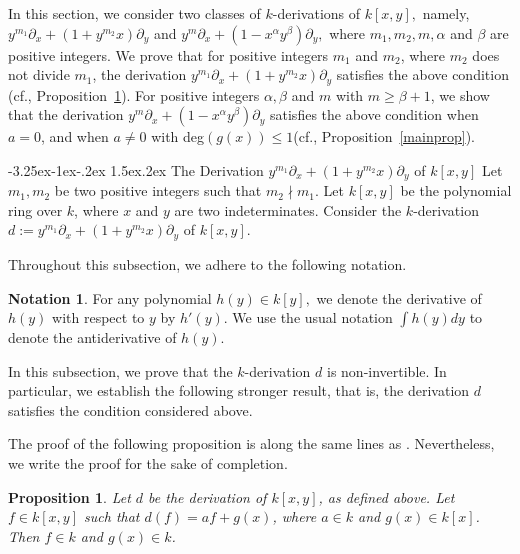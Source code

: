 \documentclass[12pt,reqno]{amsart}
\makeatletter
\renewcommand{\subsection}{%
  \@startsection{subsection}{2}{\z@}%
    {-3.25ex\@plus -1ex\@minus -.2ex}%
    {1.5ex\@plus .2ex}%
    {\normalfont\bfseries}}
\renewcommand{\leq}{\leqslant}
\renewcommand{\geq}{\geqslant}
\numberwithin{thm}{section}
\newtheorem{prop}[thm]{Proposition}
\theoremstyle{definition}
\newtheorem{nota}[thm]{Notation}
\numberwithin{equation}{thm}
\theoremstyle{plain}
\makeatother
\begin{document}
In this section, we consider two classes of $k$-derivations of $k[x,y],$ namely, $y^{m_1}\partial_{x}+(1+y^{m_2}x)\partial_{y}$ and $y^m\partial_x+(1-x^{\alpha} y^{\beta})\partial_y,$ where $m_1,m_2,m,\alpha$ and $\beta$ are positive integers. We prove that for positive integers $m_1$ and $m_2$, where $m_2$ does not divide $m_1$, the derivation $y^{m_1}\partial_{x}+(1+y^{m_2}x)\partial_{y}$ satisfies the above condition (cf., Proposition~\ref{prop:main}). For positive integers $\alpha,\beta$ and $m$ with $m\geq \beta+1$, we show that the derivation $y^m\partial_x+(1-x^{\alpha} y^{\beta})\partial_y$ satisfies the above condition when $a=0$, and when $a\neq 0$ with deg$(g(x))\leq 1$(cf., Proposition~\ref{mainprop}).   

\subsection{The Derivation $y^{m_1}\partial_{x}+(1+y^{m_2}x)\partial_{y}$ of $k[x,y]$} 
\vspace{0.5 cm}
Let $m_1,m_2$ be two positive integers such that $m_2 \nmid m_1$. Let $k[x,y]$ be the polynomial ring over $k$, where $x$ and $y$ are two indeterminates. Consider the $k$-derivation $d:=y^{m_1}\partial_x+(1+y^{m_2}x)\partial_{y}$ of $k[x,y]$.

Throughout this subsection, we adhere to the following notation.

\begin{nota}
    For any polynomial $h(y)\in k[y],$ we denote the derivative of $h(y)$ with respect to $y$ by $h'(y).$ We use the usual notation $\int h(y)dy$ to denote the antiderivative of $h(y).$ 
\end{nota}

In this subsection, we prove that the $k$-derivation $d$ is non-invertible. In particular, we establish the following stronger result, that is, the derivation $d$ satisfies the condition considered above.

The proof of the following proposition is along the same lines as \cite[Lemma 3.1]{MMS25'}. Nevertheless, we write the proof for the sake of completion.

\begin{prop}\label{prop:main}
Let $d$ be the derivation of $k[x,y]$, as defined above. Let $f \in k[x,y]$ such that $d(f)=af+g(x)$, where $a \in k$ and $g(x)\in k[x]$. Then $f\in k$ and $g(x) \in k$.
\end{prop}
\end{document}
